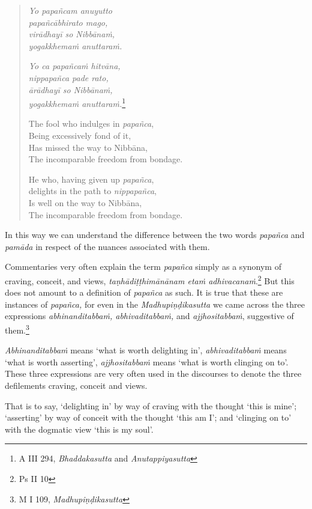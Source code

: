 \begin{quote}
\emph{Yo papañcam anuyutto}\\
\emph{papañcābhirato mago,}\\
\emph{virādhayī so Nibbānaṁ,}\\
\emph{yogakkhemaṁ anuttaraṁ.}

\emph{Yo ca papañcaṁ hitvāna,}\\
\emph{nippapañca pade rato,}\\
\emph{ārādhayī so Nibbānaṁ,}\\
\emph{yogakkhemaṁ anuttaraṁ.}\footnote{A III 294, \emph{Bhaddakasutta} and \emph{Anutappiyasutta}}

The fool who indulges in \emph{papañca},\\
Being excessively fond of it,\\
Has missed the way to Nibbāna,\\
The incomparable freedom from bondage.

He who, having given up \emph{papañca},\\
delights in the path to \emph{nippapañca},\\
Is well on the way to Nibbāna,\\
The incomparable freedom from bondage.
\end{quote}

In this way we can understand the difference between the two words \emph{papañca} and \emph{pamāda} in respect of the nuances associated with them.

Commentaries very often explain the term \emph{papañca} simply as a synonym of craving, conceit, and views, \emph{taṇhādiṭṭhimānānam etaṁ adhivacanaṁ}.\footnote{Ps II 10} But this does not amount to a definition of \emph{papañca} as such. It is true that these are instances of \emph{papañca,} for even in the \emph{Madhupiṇḍikasutta} we came across the three expressions \emph{abhinanditabbaṁ, abhivaditabbaṁ,} and \emph{ajjhositabbaṁ}, suggestive of them.\footnote{M I 109, \emph{Madhupiṇḍikasutta}}

\emph{Abhinanditabbaṁ} means `what is worth delighting in', \emph{abhivaditabbaṁ} means `what is worth asserting', \emph{ajjhositabbaṁ} means `what is worth clinging on to'. These three expressions are very often used in the discourses to denote the three defilements craving, conceit and views.

That is to say, `delighting in' by way of craving with the thought `this is mine'; `asserting' by way of conceit with the thought `this am I'; and `clinging on to' with the dogmatic view `this is my soul'.

